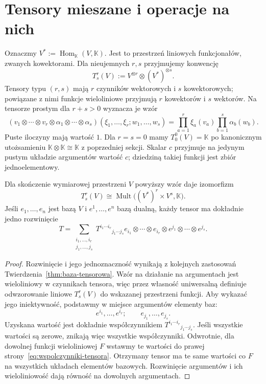 \section{Tensory mieszane i operacje na nich}
\label{sec:operacje-tensorowe}

Oznaczmy $V^*:=\operatorname{Hom}_{\mathbb K}(V,\mathbb K)$.
Jest to przestrzeń liniowych funkcjonałów, zwanych kowektorami.
Dla nieujemnych $r,s$ przyjmujemy konwencję
\begin{equation}\label{eq:typ-tensora}
 T^r_s(V):=V^{\otimes r}\otimes(V^*)^{\otimes s}.
\end{equation}
Tensory typu $(r,s)$ mają $r$ czynników wektorowych i $s$
kowektorowych; powiązane z nimi funkcje wieloliniowe
przyjmują $r$ kowektorów i $s$ wektorów. Na tensorze prostym
dla $r+s>0$ wyznacza je wzór
\[
 (v_1\otimes\cdots\otimes v_r\otimes
 \alpha_1\otimes\cdots\otimes\alpha_s)
 (\xi_1,\ldots,\xi_r;w_1,\ldots,w_s)
 =\prod_{a=1}^r\xi_a(v_a)\prod_{b=1}^s\alpha_b(w_b).
\]
Puste iloczyny mają wartość $1$. Dla $r=s=0$ mamy
$T^0_0(V)=\mathbb K$ po kanonicznym utożsamieniu
$\mathbb K\otimes\mathbb K\cong\mathbb K$ z poprzedniej sekcji.
Skalar $c$ przyjmuje na jedynym pustym układzie argumentów
wartość $c$; dziedziną takiej funkcji jest zbiór jednoelementowy.

\begin{twierdzenie}
\label{thm:tensor-wieloliniowy}
Dla skończenie wymiarowej przestrzeni $V$ powyższy wzór daje
izomorfizm
\[
 T^r_s(V)\cong
 \operatorname{Mult}\bigl((V^*)^r\times V^s,\mathbb K\bigr).
\]
Jeśli $e_1,\ldots,e_n$ jest bazą $V$ i $e^1,\ldots,e^n$
bazą dualną, każdy tensor ma dokładnie jedno rozwinięcie
\begin{equation}\label{eq:wspolczynniki-tensora}
 T=\sum_{\substack{i_1,\ldots,i_r\\j_1,\ldots,j_s}}
 T^{i_1\cdots i_r}{}_{j_1\cdots j_s}
 e_{i_1}\otimes\cdots\otimes e_{i_r}
 \otimes e^{j_1}\otimes\cdots\otimes e^{j_s}.
\end{equation}
\end{twierdzenie}
\begin{proof}
Rozwinięcie i jego jednoznaczność wynikają z kolejnych
zastosowań Twierdzenia~\ref{thm:baza-tensorowa}. Wzór
na działanie na argumentach jest wieloliniowy w czynnikach
tensora, więc przez własność uniwersalną definiuje odwzorowanie liniowe
$T^r_s(V)$ do wskazanej przestrzeni funkcji. Aby wykazać jego
iniektywność, podstawmy w miejsce argumentów elementy baz:
\[
 e^{i_1},\ldots,e^{i_r};\qquad e_{j_1},\ldots,e_{j_s}.
\]
Uzyskana wartość jest dokładnie współczynnikiem
$T^{i_1\cdots i_r}{}_{j_1\cdots j_s}$. Jeśli wszystkie wartości
są zerowe, znikają więc wszystkie współczynniki.
Odwrotnie, dla dowolnej funkcji wieloliniowej $F$ wstawmy te
wartości do prawej strony~\eqref{eq:wspolczynniki-tensora}.
Otrzymany tensor ma te same wartości co $F$ na wszystkich
układach elementów bazowych. Rozwinięcie argumentów i ich
wieloliniowość dają równość na dowolnych argumentach.
\end{proof}

